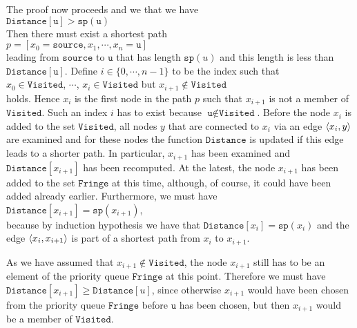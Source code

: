 \begin{enumerate}
      The proof now proceeds  and we  that we have
      \\[0.2cm]
      \hspace*{1.3cm} $\texttt{Distance}[\texttt{u}] > \texttt{sp}(\texttt{u})$
      \\[0.2cm]
      Then there must exist a shortest path 
      \\[0.2cm]
      \hspace*{1.3cm} $p = [ x_0 = \texttt{source}, x_1, \cdots, x_n = \texttt{u} ]$
      \\[0.2cm]
      leading from $\texttt{source}$ to $\texttt{u}$ that has length $\texttt{sp}(u)$ and this length is less
      than $\texttt{Distance}[\texttt{u}]$.  Define  $i\in\{0,\cdots,n-1\}$ to be the index such that
      \\[0.2cm]
      \hspace*{1.3cm}
      $x_0\in \texttt{Visited}$, $\cdots$, $x_i\in \texttt{Visited}$ \quad but \quad $x_{i+1} \not\in \texttt{Visited}$
      \\[0.2cm]
      holds.  Hence $x_i$ is the first node in the path  $p$ such that $x_{i+1}$ is not a member of
      $\texttt{Visited}$.  Such an index $i$ has to exist because $\texttt{u} \not\in \texttt{Visited}$.
      Before the node $x_i$ is added to the set $\texttt{Visited}$, all nodes $y$ that are connected
      to $x_i$ via an edge $\pair(x_i, y)$ are examined and for these nodes the function
      $\texttt{Distance}$ is updated if this edge leads to a shorter path.  In particular, $x_{i+1}$ has
      been examined and $\texttt{Distance}[x_{i+1}]$ has been recomputed.  At the latest, the node
      $x_{i+1}$ has been added to the set  $\texttt{Fringe}$ at this time, although, of course, it
      could have been added already earlier.  Furthermore, we must have
      \\[0.2cm]
      \hspace*{1.3cm}
      $\texttt{Distance}[x_{i+1}] = \texttt{sp}(x_{i+1})$,
      \\[0.2cm]
      because by induction hypothesis we have that $\texttt{Distance}[x_i] = \texttt{sp}(x_i)$ and 
      the edge $\pair(x_i,x_{i+1})$ is part of a shortest path from  $x_i$ to $x_{i+1}$.
      
      As we have assumed that $x_{i+1} \not\in \texttt{Visited}$, the node $x_{i+1}$ still has to be an
      element of the priority queue $\texttt{Fringe}$ at this point.  Therefore we must have
      $\texttt{Distance}[x_{i+1}] \geq \texttt{Distance}[u]$, since otherwise  $x_{i+1}$ would have been
      chosen from the priority queue $\texttt{Fringe}$ before $\texttt{u}$ has been chosen, but then $x_{i+1}$
      would be a member of $\texttt{Visited}$.


\end{enumerate}
